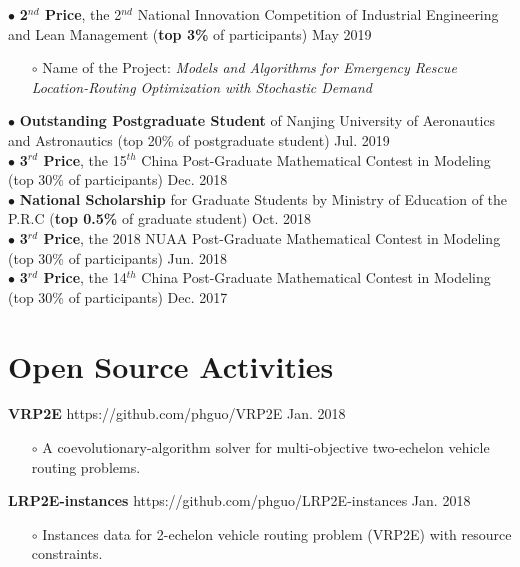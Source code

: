 \documentclass[margin]{res}
\begin{document}
\begin{resume}
$\bullet$ {\bf 2\(^{nd}\) Price}, the 2\(^{nd}\) National Innovation Competition of Industrial Engineering and Lean Management ({\bf top 3\%} of participants) \hfill May 2019 
\begin{itemize}  \itemsep -2pt  %
\item[\(\circ\)] Name of the Project: \textit{Models and Algorithms for Emergency Rescue Location-Routing Optimization with Stochastic Demand}
\end{itemize} \vspace{-1em}

$\bullet$ {\bf Outstanding Postgraduate Student} of Nanjing University of Aeronautics and Astronautics (top 20\% of postgraduate student) \hfill Jul. 2019 \\
$\bullet$ {\bf 3\(^{rd}\) Price}, the 15\(^{th}\) China Post-Graduate Mathematical Contest in Modeling (top 30\% of participants) \hfill Dec. 2018 \\
$\bullet$ {\bf National Scholarship} for Graduate Students by Ministry of Education of the P.R.C ({\bf top 0.5\%} of graduate student) \hfill Oct. 2018 \\
$\bullet$ {\bf 3\(^{rd}\) Price}, the 2018 NUAA Post-Graduate Mathematical Contest in Modeling (top 30\% of participants) \hfill Jun. 2018 \\
$\bullet$ {\bf 3\(^{rd}\) Price}, the 14\(^{th}\) China Post-Graduate Mathematical Contest in Modeling (top 30\% of participants) \hfill Dec. 2017





\section{\sc Open Source Activities} 

\textbf{{VRP2E }} https://github.com/phguo/VRP2E \hfill Jan. 2018
\begin{itemize} \itemsep -2pt
\item[\(\circ\)] A coevolutionary-algorithm solver for multi-objective two-echelon vehicle routing problems.
\end{itemize} \vspace{-.5em}
\textbf{{LRP2E-instances }} https://github.com/phguo/LRP2E-instances \hfill Jan. 2018
\begin{itemize} \itemsep -2pt
\item[\(\circ\)] Instances data for 2-echelon vehicle routing problem (VRP2E) with resource constraints. 
\end{itemize}






\end{resume}
\end{document}
